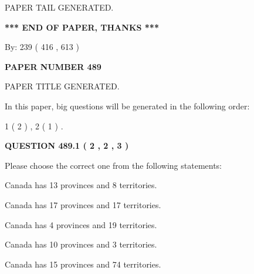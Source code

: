 \documentclass[12pt]{article}
\begin{document}
   
   
\vspace{2.0in} PAPER TAIL GENERATED.
   
   
   
   
\vspace{1.0in} 
{\textbf{\large{ *** END OF PAPER, THANKS *** }}} 
   
   
\hspace{1.0in} By: 
 239 ( 416 ,  613 )
   
   
   
   
\newpage 
\setcounter{page}{ 
   489001 } 
   
   
   
   
 {\textbf{ \Large{ PAPER NUMBER  489  }}}
   
   
\vspace{0.2in}
   
   
   
   
   
   
   
   
 \vspace{0.2in}
 
 
 
 
   
   
 PAPER TITLE GENERATED.
   
   
   
\vspace{0.2in}
   
In this paper, big questions will be generated in the following order: 
   
   
   1 ( 2 )
 ,
   2 ( 1 )
 .
  
\vspace{0.2in}
  
{\textbf{\Large{QUESTION
489.1 
 ( 2 , 2 , 3 )
}}}
  
  
Please choose the correct one from the following statements:
 
 
Canada has  13 provinces and  8 territories.
 
 
Canada has  17 provinces and  17 territories.
 
 
Canada has   4 provinces and  19 territories.
 
 
Canada has 10  provinces and 3 territories.
 
 
Canada has  15 provinces and  74 territories.
 
\end{document}
